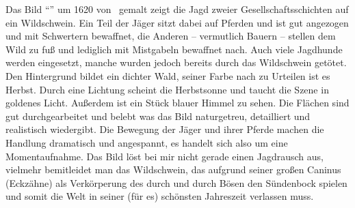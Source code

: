Das Bild \enquote{\BildName} um 1620 von \KuenstlerName ~gemalt
zeigt die Jagd zweier Gesellschaftsschichten auf ein Wildschwein.
Ein Teil der Jäger sitzt dabei auf Pferden und ist gut angezogen und mit Schwertern bewaffnet, die Anderen
-- vermutlich Bauern -- stellen dem Wild zu fuß und lediglich mit
Mistgabeln bewaffnet nach.
Auch viele Jagdhunde werden eingesetzt, manche wurden jedoch bereits durch das Wildschwein getötet.
Den Hintergrund bildet ein dichter Wald, seiner Farbe nach zu Urteilen ist es Herbst.
Durch eine Lichtung scheint die Herbstsonne und taucht die Szene in goldenes Licht.
Außerdem ist ein Stück blauer Himmel zu sehen.
Die Flächen sind gut durchgearbeitet und belebt was das Bild naturgetreu, detailliert und realistisch wiedergibt.
Die Bewegung der Jäger und ihrer Pferde machen die Handlung dramatisch und angespannt,
es handelt sich also um eine Momentaufnahme.
Das Bild löst bei mir nicht gerade einen Jagdrausch aus, vielmehr bemitleidet man das Wildschwein,
das aufgrund seiner großen Caninus (Eckzähne) als Verkörperung des durch und durch
Bösen den Sündenbock spielen und somit die Welt in seiner (für es) schönsten Jahreszeit verlassen muss.
